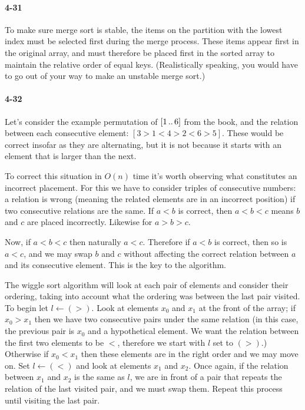 \documentclass{report}
\newcommand{\ldotsTwo}{%
  \mathinner{{\ldotp}{\ldotp}}%
}
\begin{document}
\paragraph{4-31} To make sure merge sort is stable, the items on the partition with the lowest index must be selected first during the merge process. These items appear first in the original array, and must therefore be placed first in the sorted array to maintain the relative order of equal keys. (Realistically speaking, you would have to go out of your way to make an unstable merge sort.)

\paragraph{4-32} Let's consider the example permutation of $[1\ldotsTwo6]$ from the book, and the relation between each consecutive element: $[3 > 1 < 4 > 2 < 6 > 5]$. These would be correct insofar as they are alternating, but it is not because it starts with an element that is larger than the next.

To correct this situation in $O(n)$ time it's worth observing what constitutes an incorrect placement. For this we have to consider triples of consecutive numbers: a relation is wrong (meaning the related elements are in an incorrect position) if two consecutive relations are the same. If $a < b$ is correct, then $a < b < c$ means $b$ and $c$ are placed incorrectly. Likewise for $a > b > c$.

Now, if $a < b < c$ then naturally $a < c$. Therefore if $a < b$ is correct, then so is $a < c$, and we may swap $b$ and $c$ without affecting the correct relation between $a$ and its consecutive element. This is the key to the algorithm.

\smallskip

The wiggle sort algorithm will look at each pair of elements and consider their ordering, taking into account what the ordering was between the last pair visited. To begin let $l\gets(>)$. Look at elements $x_0$ and $x_1$ at the front of the array; if $x_0 > x_1$ then we have two consecutive pairs under the same relation (in this case, the previous pair is $x_0$ and a hypothetical element. We want the relation between the first two elements to be $<$, therefore we start with $l$ set to $(>)$.) Otherwise if $x_0 < x_1$ then these elements are in the right order and we may move on. Set $l\gets(<)$ and look at elements $x_1$ and $x_2$. Once again, if the relation between $x_1$ and $x_2$ is the same as $l$, we are in front of a pair that repeats the relation of the last visited pair, and we must swap them. Repeat this process until visiting the last pair.
\end{document}
